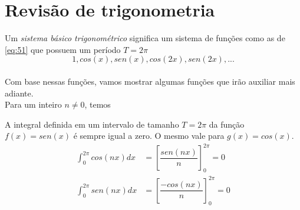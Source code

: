 \chapter{Revisão de trigonometria}

Um \textit{sistema básico trigonométrico} significa um sistema de funções como 
as de \ref{eq:51} que possuem um período $T=2\pi$\\
\begin{equation}
    1, cos(x), sen(x), cos(2x), sen(2x), ... 
\label{eq:51}
\end{equation}
\\
Com base nessas funções, vamos mostrar algumas funções que irão auxiliar mais
adiante.\\


Para um inteiro $n \neq 0$, temos\\
\begin{definicao}
    \label{def:52}
    A integral definida em um intervalo de tamanho $T=2\pi$ da função $f(x)=sen(x)$ é sempre 
    igual a zero. O mesmo vale para $g(x)=cos(x)$.
    \begin{equation}
        \begin{split}
            \int_{0}^{2\pi}cos(nx)dx & = \left[\dfrac{sen(nx)}{n}\right]_{0}^{2\pi} = 0\\
            \int_{0}^{2\pi}sen(nx)dx & = \left[\dfrac{-cos(nx)}{n}\right]_{0}^{2\pi} = 0
        \end{split}
    \end{equation}
\end{definicao}

